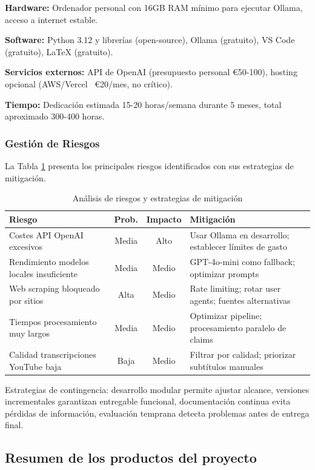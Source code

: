\documentclass[12pt,a4paper,twoside]{book}
\begin{document}
\textbf{Hardware:} Ordenador personal con 16GB RAM mínimo para ejecutar Ollama, acceso a internet estable.

\textbf{Software:} Python 3.12 y librerías (open-source), Ollama (gratuito), VS Code (gratuito), LaTeX (gratuito).

\textbf{Servicios externos:} API de OpenAI (presupuesto personal €50-100), hosting opcional (AWS/Vercel ~€20/mes, no crítico).

\textbf{Tiempo:} Dedicación estimada 15-20 horas/semana durante 5 meses, total aproximado 300-400 horas.

\subsubsection{Gestión de Riesgos}

La Tabla \ref{tab:riesgos} presenta los principales riesgos identificados con sus estrategias de mitigación.

\begin{table}[h]
\centering
\small
\begin{tabular}{|p{4cm}|c|c|p{5cm}|}
\hline
\textbf{Riesgo} & \textbf{Prob.} & \textbf{Impacto} & \textbf{Mitigación} \\
\hline
Costes API OpenAI excesivos & Media & Alto & Usar Ollama en desarrollo; establecer límites de gasto \\
\hline
Rendimiento modelos locales insuficiente & Media & Medio & GPT-4o-mini como fallback; optimizar prompts \\
\hline
Web scraping bloqueado por sitios & Alta & Medio & Rate limiting; rotar user agents; fuentes alternativas \\
\hline
Tiempos procesamiento muy largos & Media & Medio & Optimizar pipeline; procesamiento paralelo de claims \\
\hline
Calidad transcripciones YouTube baja & Baja & Medio & Filtrar por calidad; priorizar subtítulos manuales \\
\hline
\end{tabular}
\caption{Análisis de riesgos y estrategias de mitigación}
\label{tab:riesgos}
\end{table}

Estrategias de contingencia: desarrollo modular permite ajustar alcance, versiones incrementales garantizan entregable funcional, documentación continua evita pérdidas de información, evaluación temprana detecta problemas antes de entrega final.

\subsection{Resumen de los productos del proyecto}
\end{document}
